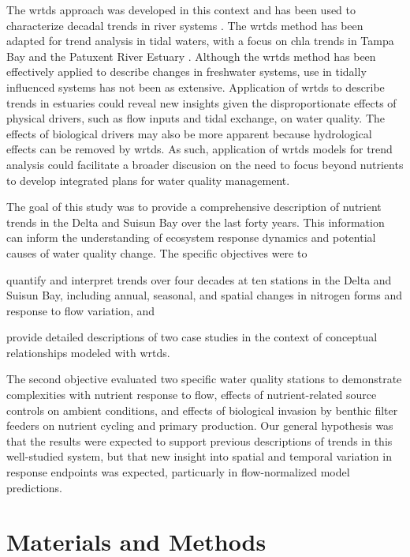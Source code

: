\documentclass[letterpaper,12pt,oneside]{article}\usepackage[]{graphicx}\usepackage[]{color}
\begin{document}
The \ac{wrtds} approach was developed in this context and has been used to characterize decadal trends in river systems \citep{Hirsch10,Sprague11,Medalie12,Hirsch14,Pellerin14,Zhang16}.  The \ac{wrtds} method has been adapted for trend analysis in tidal waters, with a focus on \ac{chla} trends in Tampa Bay \citep{Beck15} and the Patuxent River Estuary \citep{Beck17}. Although the \ac{wrtds} method has been effectively applied to describe changes in freshwater systems, use in tidally influenced systems has not been as extensive.  Application of \ac{wrtds} to describe trends in estuaries could reveal new insights given the disproportionate effects of physical drivers, such as flow inputs and tidal exchange, on water quality. The effects of biological drivers may also be more apparent because hydrological effects can be removed by \ac{wrtds}.  As such, application of \ac{wrtds} models for trend analysis could facilitate a broader discusion on the need to focus beyond nutrients to develop integrated plans for water quality management. 

The goal of this study was to provide a comprehensive description of nutrient trends in the Delta and Suisun Bay over the last forty years.  This information can inform the  understanding of ecosystem response dynamics and potential causes of water quality change. The specific objectives were to \begin{inparaenum}[1\upshape)]  
\item quantify and interpret trends over four decades at ten stations in the Delta and Suisun Bay, including annual, seasonal, and spatial changes in nitrogen forms and response to flow variation, and
\item provide detailed descriptions of two case studies in the context of conceptual relationships modeled with \ac{wrtds}.
\end{inparaenum}
The second objective evaluated two specific water quality stations to demonstrate complexities with nutrient response to flow, effects of nutrient-related source controls on ambient conditions, and effects of biological invasion by benthic filter feeders on nutrient cycling and primary production.  Our general hypothesis was that the results were expected to support previous descriptions of trends in this well-studied system, but that new insight into spatial and temporal variation in response endpoints was expected, particuarly in flow-normalized model predictions.

\section{Materials and Methods}
\end{document}
